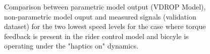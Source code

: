  \begin{figure}[!h]
    \centering
    \begin{subfigure}[b]{\textwidth}
        \centering
        \caption{}
        \label{fig:ropm_val1}
    \end{subfigure}
    \begin{subfigure}[b]{\textwidth}
        \centering
        \caption{}
        \label{fig:ropm_val2}
    \end{subfigure}
    \caption{Comparison between parametric model output (VDROP Model), non-parametric model ouput and measured signals (validation dataset) for the two lowest speed levels for the case where torque feedback is present in the rider control model and biccyle is operating under the "haptics on" dynamics.}
    \label{fig:ropm_valA}
 \end{figure}




